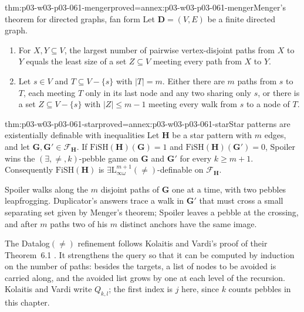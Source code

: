 \begin{hbtheorem}{thm:p03-w03-p03-061-menger}{proved=annex:p03-w03-p03-061-menger}{Menger's theorem for directed graphs, fan form}
Let \(\mathbf D=(V,E)\) be a finite directed graph.
\begin{enumerate}
\item For \(X,Y\subseteq V\), the largest number of pairwise vertex-disjoint
      paths from \(X\) to \(Y\) equals the least size of a set
      \(Z\subseteq V\) meeting every path from \(X\) to \(Y\).
\item Let \(s\in V\) and \(T\subseteq V-\{s\}\) with \(|T|=m\). Either there
      are \(m\) paths from \(s\) to \(T\), each meeting \(T\) only in its
      last node and any two sharing only \(s\), or there is a set
      \(Z\subseteq V-\{s\}\) with \(|Z|\le m-1\) meeting every walk from
      \(s\) to a node of \(T\).
\end{enumerate}
\end{hbtheorem}

\begin{hbtheorem}{thm:p03-w03-p03-061-star}{proved=annex:p03-w03-p03-061-star}{Star patterns are existentially definable with inequalities}
Let \(\mathbf H\) be a star pattern with \(m\) edges, and let
\(\mathbf G,\mathbf G'\in\mathcal F_{\mathbf H}\). If
\(\mathrm{FiSH}(\mathbf H)(\mathbf G)=1\) and
\(\mathrm{FiSH}(\mathbf H)(\mathbf G')=0\), Spoiler wins the
\((\exists,\neq,k)\)-pebble game on \(\mathbf G\) and \(\mathbf G'\) for
every \(k\ge m+1\). Consequently \(\mathrm{FiSH}(\mathbf H)\) is
\(\exists\mathrm L^{m+1}_{\infty\omega}(\neq)\)-definable on
\(\mathcal F_{\mathbf H}\).
\end{hbtheorem}

Spoiler walks along the \(m\) disjoint paths of \(\mathbf G\) one at a time,
with two pebbles leapfrogging. Duplicator's answers trace a walk in
\(\mathbf G'\) that must cross a small separating set given by Menger's
theorem; Spoiler leaves a pebble at the crossing, and after \(m\) paths two
of his \(m\) distinct anchors have the same image.

The Datalog\((\neq)\) refinement follows Kolaitis and Vardi's proof of their
Theorem~6.1 \cite[Thm~6.1, pp.~23--25]{KolaitisVardi1995DatalogManuscript}.
It strengthens the query so that it can be computed by induction on the
number of paths: besides the targets, a list of nodes to be avoided is
carried along, and the avoided list grows by one at each level of the
recursion. Kolaitis and Vardi write \(Q_{k,l}\); the first index is \(j\)
here, since \(k\) counts pebbles in this chapter.

